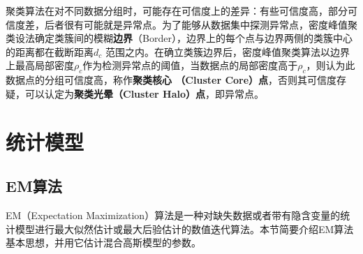 聚类算法在对不同数据分组时，可能存在可信度上的差异：有些可信度高，部分可信度差，后者很有可能就是异常点。为了能够从数据集中探测异常点，密度峰值聚类设法确定类簇间的模糊\textbf{边界}（Border），边界上的每个点与边界两侧的类簇中心的距离都在截断距离$d_c$ 范围之内。在确立类簇边界后，密度峰值聚类算法以边界上最高局部密度$\rho_c$作为检测异常点的阈值，当数据点的局部密度高于$\rho_c$，则认为此数据点的分组可信度高，称作\textbf{聚类核心
（Cluster Core）点}，否则其可信度存疑，可以认定为\textbf{聚类光晕（Cluster Halo）点}，即异常点。

\chapter{统计模型}
\section{EM算法}
EM（Expectation Maximization）算法是一种对缺失数据或者带有隐含变量的统计模型进行最大似然估计或最大后验估计的数值迭代算法\cite{dempster1977maximum}。本节简要介绍EM算法基本思想，并用它估计混合高斯模型的参数。

